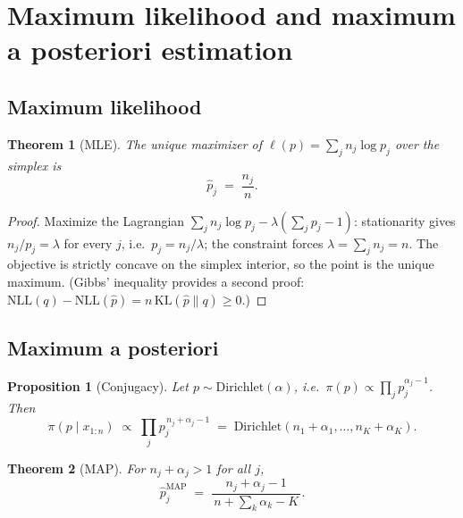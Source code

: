\documentclass[11pt]{article}
\newtheorem{theorem}{Theorem}
\newtheorem{proposition}{Proposition}
\theoremstyle{remark}
\begin{document}
\section{Maximum likelihood and maximum a posteriori estimation}

\subsection{Maximum likelihood}

\begin{theorem}[MLE]
\label{thm:mle}
The unique maximizer of $\ell(p) = \sum_j n_j \log p_j$ over the
simplex is
\begin{equation}
  \boxed{\;\hat p_j \;=\; \frac{n_j}{n}.\;}
  \label{eq:mle}
\end{equation}
\end{theorem}

\begin{proof}
Maximize the Lagrangian
$\sum_j n_j \log p_j - \lambda(\sum_j p_j - 1)$: stationarity gives
$n_j / p_j = \lambda$ for every $j$, i.e.\ $p_j = n_j/\lambda$;
the constraint forces $\lambda = \sum_j n_j = n$. The objective is
strictly concave on the simplex interior, so the point is the unique
maximum. (Gibbs' inequality provides a second proof:
$\mathrm{NLL}(q) - \mathrm{NLL}(\hat p) = n\,\mathrm{KL}(\hat p\|q)
\ge 0$.)
\end{proof}

\subsection{Maximum a posteriori}

\begin{proposition}[Conjugacy]
Let $p \sim \mathrm{Dirichlet}(\alpha)$, i.e.\
$\pi(p) \propto \prod_j p_j^{\alpha_j - 1}$. Then
\begin{equation*}
  \pi(p \mid x_{1:n}) \;\propto\; \prod_j p_j^{\,n_j + \alpha_j - 1}
  \;=\; \mathrm{Dirichlet}(n_1 + \alpha_1, \dots, n_K + \alpha_K).
\end{equation*}
\end{proposition}

\begin{theorem}[MAP]
For $n_j + \alpha_j > 1$ for all $j$,
\begin{equation}
  \boxed{\;\hat p_j^{\mathrm{MAP}}
  \;=\; \frac{n_j + \alpha_j - 1}{\,n + \sum_k \alpha_k - K\,}.\;}
  \label{eq:map}
\end{equation}
\end{theorem}
\end{document}
